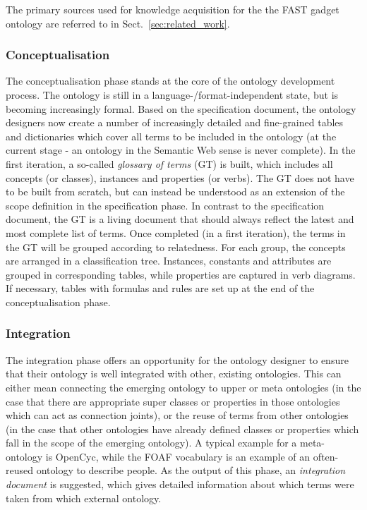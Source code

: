 \documentclass[twoside]{fast_latex}
\begin{document}
The primary sources used for knowledge acquisition for the the FAST gadget ontology are referred to in Sect.~\ref{sec:related_work}.

\subsubsection{Conceptualisation} %
\label{ssub:conceptualisation}

The conceptualisation phase stands at the core of the ontology development process. The ontology is still in a language-/format-independent state, but is becoming increasingly formal. Based on the specification document, the ontology designers now create a number of increasingly detailed and fine-grained tables and dictionaries which cover all terms to be included in the ontology (at the current stage - an ontology in the Semantic Web sense is never complete). In the first iteration, a so-called \emph{glossary of terms} (GT) is built, which includes all concepts (or classes), instances and properties (or verbs). The GT does not have to be built from scratch, but can instead be understood as an extension of the scope definition in the specification phase.  In contrast to the specification document, the GT is a living document that should always reflect the latest and most complete list of terms. Once completed (in a first iteration), the terms in the GT will be grouped according to relatedness. For each group, the concepts are arranged in a classification tree. Instances, constants and attributes are grouped in corresponding tables, while properties are captured in verb diagrams. If necessary, tables with formulas and rules are set up at the end of the conceptualisation phase.

\subsubsection{Integration} %
\label{ssub:integration}

The integration phase offers an opportunity for the ontology designer to ensure that their ontology is well integrated with other, existing ontologies. This can either mean connecting the emerging ontology to upper or meta ontologies (in the case that there are appropriate super classes or properties in those ontologies which can act as connection joints), or the reuse of terms from other ontologies (in the case that other ontologies have already defined classes or properties which fall in the scope of the emerging ontology). A typical example for a meta-ontology is OpenCyc, while the FOAF vocabulary \cite{brickley2004foaf} is an example of an often-reused ontology to describe people. As the output of this phase, an \emph{integration document} is suggested, which gives detailed information about which terms were taken from which external ontology.
\end{document}
